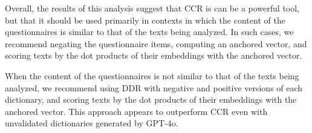 \documentclass[
  man,
  floatsintext,
  longtable,
  nolmodern,
  notxfonts,
  notimes,
  colorlinks=true,linkcolor=blue,citecolor=blue,urlcolor=blue]{apa7}
\begin{document}
Overall, the results of this analysis suggest that CCR is can be a
powerful tool, but that it should be used primarily in contexts in which
the content of the questionnaires is similar to that of the texts being
analyzed. In such cases, we recommend negating the questionnaire items,
computing an anchored vector, and scoring texts by the dot products of
their embeddings with the anchored vector.

When the content of the questionnaires is not similar to that of the
texts being analyzed, we recommend using DDR with negative and positive
versions of each dictionary, and scoring texts by the dot products of
their embeddings with the anchored vector. This approach appears to
outperform CCR even with unvalidated dictionaries generated by GPT-4o.
\end{document}
